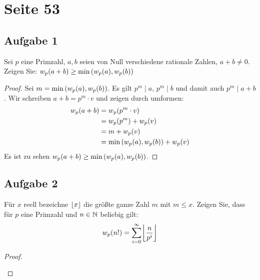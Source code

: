 \section{Seite 53}

\subsection{Aufgabe 1}
Sei $p$ eine Primzahl, $a,b$ seien von Null verschiedene rationale Zahlen,
$a + b \neq 0$. Zeigen Sie: $w_p(a + b) \geq \min{(w_p(a), w_p(b))}$
\begin{proof}
  Sei $m = \min{(w_p(a), w_p(b))}$. Es gilt $p^m \mid a$, $p^m \mid b$
  und damit auch $p^m \mid a + b$. Wir schreiben $a + b = p^m \cdot v$
  und zeigen durch umformen:
  \begin{align*}
    w_p(a + b) & = w_p(p^m \cdot v)                                            \\
                             & = w_p(p^m) + w_p(v)                             \\
                             & = m + w_p(v)                                                  \\
                             & = \min{(w_p(a), w_p(b))} + w_p(v)
  \end{align*}
  Es ist zu sehen $w_p(a + b) \geq \min{(w_p(a), w_p(b))}$.
\end{proof}

\newpage
\subsection{Aufgabe 2}
Für $x$ reell bezeichne $\lfloor x\rfloor$ die größte ganze Zahl $m$ mit $m \leq x$.
Zeigen Sie, dass für $p$ eine Primzahl und $n \in \mathbb{N}{}$ beliebig gilt:
\begin{equation*}
  \Vielfachfunktion{n!} = \sum_{i=0}^{\infty} \floor*{\frac{n}{p^i}}
\end{equation*}
\begin{proof}
  \begin{figure}
    \centering
  \end{figure}
\end{proof}
